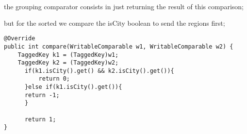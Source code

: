 \documentclass[a4paper]{article}
\begin{document}
the grouping comparator consists in just returning the result of this comparison;

but for the sorted  we compare the isCity boolean to send the regions first;


\begin{lstlisting}
@Override
public int compare(WritableComparable w1, WritableComparable w2) {
    TaggedKey k1 = (TaggedKey)w1;
    TaggedKey k2 = (TaggedKey)w2;
      if(k1.isCity().get() && k2.isCity().get()){
          return 0;
      }else if(k1.isCity().get()){
      return -1;
      }

      return 1;
}
\end{lstlisting}
\end{document}
